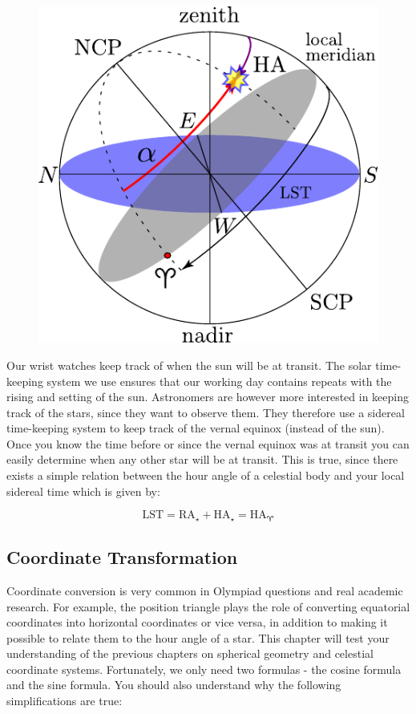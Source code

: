 \documentclass[a4paper,12pt]{extarticle}
\begin{document}
\begin{figure}
	\centering
	\includegraphics[width=\linewidth]{lst_cel.pdf}
\end{figure}
Our wrist watches keep track of when the sun will be at transit. The solar time-keeping system we use ensures that our working day contains repeats with the rising and setting of the sun. Astronomers are however more interested in keeping track of the stars, since they want to observe them. They therefore use a sidereal time-keeping system to keep track of the vernal equinox (instead of the sun).\\

Once you know the time before or since the vernal equinox was at transit you can easily determine when any other star will be at transit. This is true, since there exists a simple relation between the hour angle of a celestial body and your local sidereal time which is given by:

\[\boxed{\text{LST}= \text{RA}_\star + \text{HA}_\star=\text{HA}_{\aries}} \]

\subsection*{Coordinate Transformation}

Coordinate conversion is very common in Olympiad questions and real academic research. For example, the position triangle plays the role of converting equatorial coordinates into horizontal coordinates or vice versa, in addition to making it possible to relate them to the hour angle of a star. This chapter will test your understanding of the previous chapters on spherical geometry and celestial coordinate systems. Fortunately, we only need two formulas - the cosine formula and the sine formula. You should also understand why the following
simplifications are true:
\end{document}
